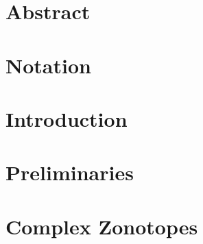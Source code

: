 \documentclass[11pt,a4paper,twoside,openright]{book}
\begin{document}
\pagestyle{empty}


\frontmatter
\pagestyle{plain}

% 
% 
% 
\chapter{Abstract} 
% 
% 
\cleardoublepage
{}
\tableofcontents
\listofalgorithms

\chapter*{Notation} 

\mainmatter 
\pagestyle{fancy}

\chapter{Introduction} 

\chapter{Preliminaries} \label{sec:prelim} 
  
\chapter{Complex Zonotopes} \label{sec:ch1} 
\end{document}
